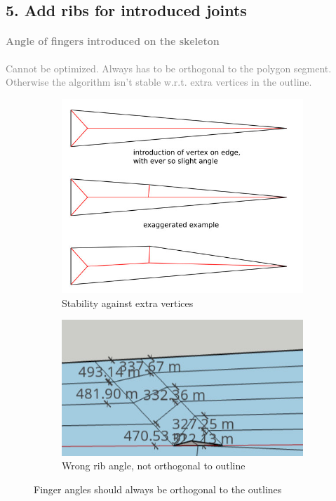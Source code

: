 \subsection{5. Add ribs for introduced joints}
\textcolor{gray}{
\paragraph{Angle of fingers introduced on the skeleton}
Cannot be optimized.
Always has to be orthogonal to the polygon segment.
Otherwise the algorithm isn't stable w.r.t. extra vertices in the outline.
}
\begin{figure}[H]
\begin{subfigure}{0.45\columnwidth}
\includegraphics[width=\columnwidth]{sources/method/finger_angles.jpg}
\caption{Stability against extra vertices}
\label{finger_angles_stability}
\end{subfigure}
\begin{subfigure}{0.45\columnwidth}
\includegraphics[width=\columnwidth]{sources/method/finger_angles_2.jpg}
\caption{Wrong rib angle, not orthogonal to outline}
\end{subfigure}
\caption{Finger angles should always be orthogonal to the outlines}
\label{finger_angles}
\end{figure}

